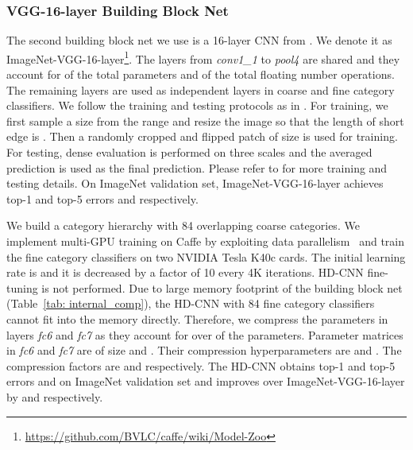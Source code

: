 \documentclass[10pt,twocolumn,letterpaper]{article}
\begin{document}
\subsubsection{VGG-16-layer Building Block Net}
The second building block net we use is a 16-layer CNN from \cite{simonyan2014very}. We denote it as ImageNet-VGG-16-layer\footnote{\url{https://github.com/BVLC/caffe/wiki/Model-Zoo}}. The layers from \textit{conv1\_1} to \textit{pool4} are shared and they account for  of the total parameters and  of the total floating number operations. The remaining layers are used as independent layers in coarse and fine category classifiers. We follow the training and testing protocols as in \cite{simonyan2014very}. For training, we first sample a size  from the range  and resize the image so that the length of short edge is . Then a randomly cropped and flipped patch of size  is used for training. For testing, dense evaluation is performed on three scales  and the averaged prediction is used as the final prediction. Please refer to \cite{simonyan2014very} for more training and testing details. On ImageNet validation set, ImageNet-VGG-16-layer achieves top-1 and top-5 errors  and  respectively.

We build a category hierarchy with 84 overlapping coarse categories. We implement multi-GPU training on Caffe by exploiting data parallelism~\cite{simonyan2014very} and train the fine category classifiers on two NVIDIA Tesla K40c cards. The initial learning rate is  and it is decreased by a factor of 10 every 4K iterations. HD-CNN fine-tuning is not performed. Due to large memory footprint of the building block net (Table~\ref{tab: internal_comp}), the HD-CNN with 84 fine category classifiers cannot fit into the memory directly. Therefore, we compress the parameters in layers \textit{fc6} and \textit{fc7} as they account for over  of the parameters. Parameter matrices in \textit{fc6} and \textit{fc7} are of size  and . Their compression hyperparameters are  and . The compression factors are  and  respectively.
The HD-CNN obtains top-1 and top-5 errors  and  on ImageNet validation set and improves over ImageNet-VGG-16-layer by  and  respectively.
\end{document}
